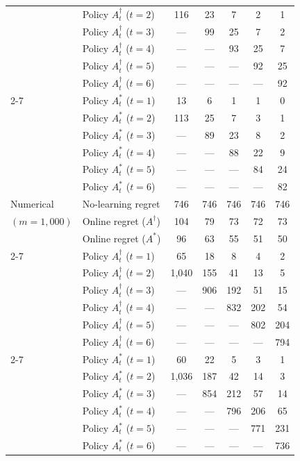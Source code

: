 \documentclass[nonblindrev]{informs3noheader}
\begin{document}
\begin{table}[h!]
\begin{tabular}{llccccc}
			&	Policy $A^\dagger_t$ ($t=2$)	&	116		&	23		&	7		&	2		&	1		\\
			&	Policy $A^\dagger_t$ ($t=3$)	&	---		&	99		&	25		&	7		&	2		\\
			&	Policy $A^\dagger_t$ ($t=4$)	&	---		&	---		&	93		&	25		&	7		\\
			&	Policy $A^\dagger_t$ ($t=5$)	&	---		&	---		&	---		&	92		&	25		\\
			&	Policy $A^\dagger_t$ ($t=6$)	&	---		&	---		&	---		&	---		&	92		\\
\cmidrule{2-7}
			&	Policy $A^*_t$ ($t=1$)	&	13		&	6		&	1		&	1		&	0		\\
			&	Policy $A^*_t$ ($t=2$)	&	113		&	25		&	7		&	3		&	1		\\
			&	Policy $A^*_t$ ($t=3$)	&	---		&	89		&	23		&	8		&	2		\\
			&	Policy $A^*_t$ ($t=4$)	&	---		&	---		&	88		&	22		&	9		\\
			&	Policy $A^*_t$ ($t=5$)	&	---		&	---		&	---		&	84		&	24		\\
			&	Policy $A^*_t$ ($t=6$)	&	---		&	---		&	---		&	---		&	82		\\
\hline
Numerical	&	No-learning regret	&	746		&	746		&	746		&	746		&	746		\\
$(m=1,000)$	&	Online regret ($A^\dagger$)		&	104		&	79		&	73		&	72		&	73		\\
	        &	Online regret ($A^*$)		&	96		&	63		&	55		&	51		&	50		\\
\cmidrule{2-7}
			&	Policy $A^\dagger_t$ ($t=1$)	&	65		&	18		&	8		&	4		&	2		\\
			&	Policy $A^\dagger_t$ ($t=2$)	&	1,040	&	155		&	41		&	13		&	5		\\
			&	Policy $A^\dagger_t$ ($t=3$)	&	---		&	906		&	192		&	51		&	15		\\
			&	Policy $A^\dagger_t$ ($t=4$)	&	---		&	---		&	832		&	202		&	54		\\
			&	Policy $A^\dagger_t$ ($t=5$)	&	---		&	---		&	---		&	802		&	204		\\
			&	Policy $A^\dagger_t$ ($t=6$)	&	---		&	---		&	---		&	---		&	794		\\
\cmidrule{2-7}
			&	Policy $A^*_t$ ($t=1$)	&	60		&	22		&	5		&	3		&	1		\\
			&	Policy $A^*_t$ ($t=2$)	&	1,036	&	187		&	42		&	14		&	3		\\
			&	Policy $A^*_t$ ($t=3$)	&	---		&	854		&	212		&	57		&	14		\\
			&	Policy $A^*_t$ ($t=4$)	&	---		&	---		&	796		&	206		&	65		\\
			&	Policy $A^*_t$ ($t=5$)	&	---		&	---		&	---		&	771		&	231		\\
			&	Policy $A^*_t$ ($t=6$)	&	---		&	---		&	---		&	---		&	736		\\
\bottomrule
\end{tabular}
\end{table}
\end{document}
